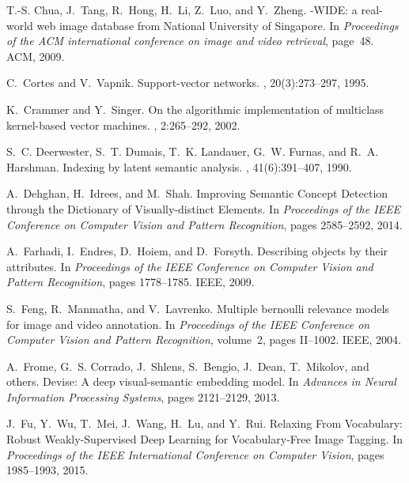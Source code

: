 \documentclass[10pt,twocolumn,letterpaper]{article}
\begin{document}
\begin{thebibliography}{10}
T.-S. Chua, J.~Tang, R.~Hong, H.~Li, Z.~Luo, and Y.~Zheng.
-{WIDE}: a real-world web image database from {National}
  {University} of {Singapore}.
\newblock In {\em Proceedings of the {ACM} international conference on image
  and video retrieval}, page~48. ACM, 2009.

C.~Cortes and V.~Vapnik.
\newblock Support-vector networks.
, 20(3):273--297, 1995.

K.~Crammer and Y.~Singer.
\newblock On the algorithmic implementation of multiclass kernel-based vector
  machines.
, 2:265--292, 2002.

S.~C. Deerwester, S.~T. Dumais, T.~K. Landauer, G.~W. Furnas, and R.~A.
  Harshman.
\newblock Indexing by latent semantic analysis.
, 41(6):391--407, 1990.

A.~Dehghan, H.~Idrees, and M.~Shah.
\newblock Improving {Semantic} {Concept} {Detection} through the {Dictionary}
  of {Visually}-distinct {Elements}.
\newblock In {\em Proceedings of the {IEEE} {Conference} on {Computer} {Vision}
  and {Pattern} {Recognition}}, pages 2585--2592, 2014.

A.~Farhadi, I.~Endres, D.~Hoiem, and D.~Forsyth.
\newblock Describing objects by their attributes.
\newblock In {\em Proceedings of the {IEEE} {Conference} on {Computer} {Vision}
  and {Pattern} {Recognition}}, pages 1778--1785. IEEE, 2009.

S.~Feng, R.~Manmatha, and V.~Lavrenko.
\newblock Multiple bernoulli relevance models for image and video annotation.
\newblock In {\em Proceedings of the {IEEE} {Conference} on {Computer} {Vision}
  and {Pattern} {Recognition}}, volume~2, pages II--1002. IEEE, 2004.

A.~Frome, G.~S. Corrado, J.~Shlens, S.~Bengio, J.~Dean, T.~Mikolov, and
  {others}.
\newblock Devise: {A} deep visual-semantic embedding model.
\newblock In {\em Advances in {Neural} {Information} {Processing} {Systems}},
  pages 2121--2129, 2013.

J.~Fu, Y.~Wu, T.~Mei, J.~Wang, H.~Lu, and Y.~Rui.
\newblock Relaxing {From} {Vocabulary}: {Robust} {Weakly}-{Supervised} {Deep}
  {Learning} for {Vocabulary}-{Free} {Image} {Tagging}.
\newblock In {\em Proceedings of the {IEEE} {International} {Conference} on
  {Computer} {Vision}}, pages 1985--1993, 2015.


\end{thebibliography}
\end{document}
